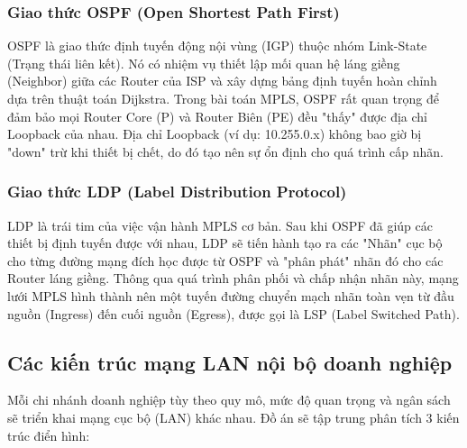 \subsubsection{Giao thức OSPF (Open Shortest Path First)}
OSPF là giao thức định tuyến động nội vùng (IGP) thuộc nhóm Link-State (Trạng thái liên kết). Nó có nhiệm vụ thiết lập mối quan hệ láng giềng (Neighbor) giữa các Router của ISP và xây dựng bảng định tuyến hoàn chỉnh dựa trên thuật toán Dijkstra. Trong bài toán MPLS, OSPF rất quan trọng để đảm bảo mọi Router Core (P) và Router Biên (PE) đều "thấy" được địa chỉ Loopback của nhau. Địa chỉ Loopback (ví dụ: 10.255.0.x) không bao giờ bị "down" trừ khi thiết bị chết, do đó tạo nên sự ổn định cho quá trình cấp nhãn.

\subsubsection{Giao thức LDP (Label Distribution Protocol)}
LDP là trái tim của việc vận hành MPLS cơ bản. Sau khi OSPF đã giúp các thiết bị định tuyến được với nhau, LDP sẽ tiến hành tạo ra các "Nhãn" cục bộ cho từng đường mạng đích học được từ OSPF và "phân phát" nhãn đó cho các Router láng giềng. Thông qua quá trình phân phối và chấp nhận nhãn này, mạng lưới MPLS hình thành nên một tuyến đường chuyển mạch nhãn toàn vẹn từ đầu nguồn (Ingress) đến cuối nguồn (Egress), được gọi là LSP (Label Switched Path).

\subsection{Các kiến trúc mạng LAN nội bộ doanh nghiệp}
Mỗi chi nhánh doanh nghiệp tùy theo quy mô, mức độ quan trọng và ngân sách sẽ triển khai mạng cục bộ (LAN) khác nhau. Đồ án sẽ tập trung phân tích 3 kiến trúc điển hình:


